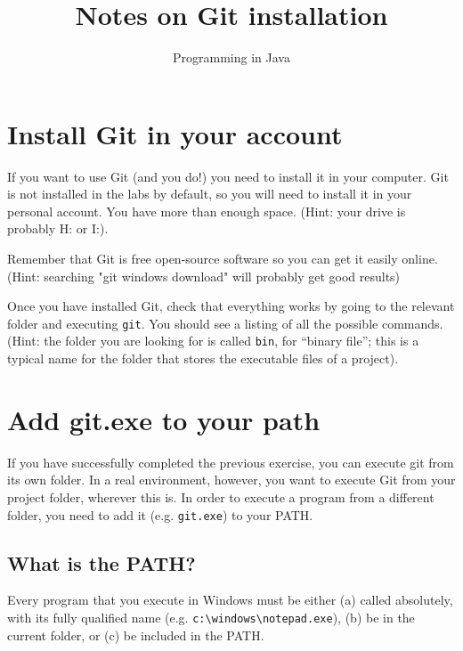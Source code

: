 \documentclass{article}
\title{Notes on Git installation}
\author{Programming in Java}
\date{}
\begin{document}
\maketitle

\vspace{1cm}

\section{Install Git in your account}
\label{sec:install-git-your}

If you want to use Git (and you do!) you need to install it in your
computer. Git is not installed in the labs by default, so you will
need to install it in your personal account. You have more than enough
space. (Hint: your drive is probably H: or I:).

Remember that Git is free open-source software so you can get it
easily online. (Hint: searching "git windows download" will
probably get good results)

Once you have installed Git, check that everything works by going to
the relevant folder and executing \verb+git+. You should see a listing
of all the possible commands. (Hint: the folder you are looking for is
called \verb+bin+, for ``binary file''; this is a typical name for the
folder that stores the executable files of a project). 

\vspace{1cm}

\section{Add git.exe to your path}
\label{sec:add-git.exe-your}

If you have successfully completed the previous exercise, you can
execute git from its own folder. In a real environment, however, you
want to execute Git from your project folder, wherever this is. In
order to execute a program from a different folder, you need to add it
(e.g. \verb+git.exe+) to your PATH. 

\subsection{What is the PATH?}
\label{sec:what-path}

Every program that you execute in Windows must be either (a) called
absolutely, with its fully qualified name
(e.g. \verb+c:\windows\notepad.exe+), (b) be in the current folder, 
or (c) be included in the PATH.
\end{document}
